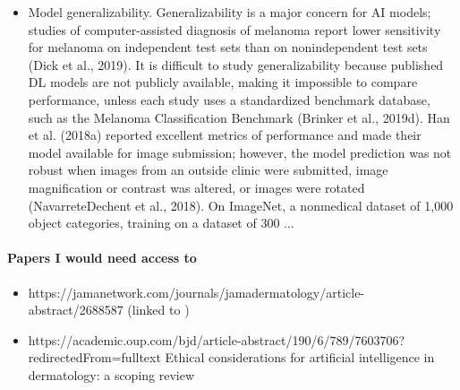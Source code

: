 \documentclass[12pt, a4paper, oneside]{book}   	%
\newif\ifrawcitationactive
\newcommand{\rawcitationend}{\color{black}\rawcitationactivefalse}
\begin{document}
\begin{itemize}
				\item Model generalizability. Generalizability is a major concern for AI models; studies of computer-assisted diagnosis of melanoma report lower sensitivity for melanoma on independent test sets than on nonindependent test sets (Dick et al., 2019). It is difficult to study generalizability because published DL models are not publicly available, making it impossible to compare performance, unless each study uses a standardized benchmark database, such as the Melanoma Classification Benchmark (Brinker et al., 2019d). Han et al. (2018a) reported excellent metrics of performance and made their model available for image submission; however, the model prediction was not robust when images from an outside clinic were submitted, image magnification or contrast was altered, or images were rotated (NavarreteDechent et al., 2018). On ImageNet, a nonmedical dataset of 1,000 object categories, training on a dataset of 300 ... \autocite{Young_2020}
			\end{itemize}
			\paragraph{Papers I would need access to}
			\begin{itemize}
				\item https://jamanetwork.com/journals/jamadermatology/article-abstract/2688587 (linked to \autocite{Young_2020})
				\item https://academic.oup.com/bjd/article-abstract/190/6/789/7603706?redirectedFrom=fulltext Ethical considerations for artificial intelligence in dermatology: a scoping review
				
			\end{itemize}
			\rawcitationend
			
\end{document}
